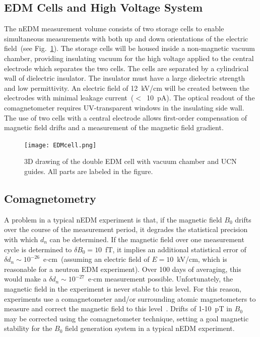 

\subsection{ EDM Cells and High Voltage System}
The nEDM measurement volume consists of two storage cells to enable
simultaneous measurements with both up and down orientations of the
electric field~(see Fig.~\ref{fig:HVcell}). The storage cells will be
housed inside a non-magnetic vacuum chamber, providing insulating
vacuum for the high voltage applied to the central electrode which
separates the two cells. The cells are separated by a cylindrical
wall of dielectric insulator. The insulator must have a large
dielectric strength and low permittivity. An electric field of
12~kV/cm will be created between the electrodes with minimal leakage
current~($<$~10~pA). The optical readout of the comagnetometer
requires UV-transparent windows in the insulating side wall. The use
of two cells with a central electrode allows first-order compensation
of magnetic field drifts and a measurement of the magnetic field
gradient.

\begin{figure}[h!]
  \centering
  \texttt{[image: EDMcell.png]}
  \caption{3D drawing of the double EDM cell with vacuum chamber and
    UCN guides. All parts are labeled in the figure.}
  \label{fig:HVcell}
\end{figure}



\subsection{Comagnetometry}
A problem in a typical nEDM experiment is that, if the magnetic field
$B_0$ drifts over the course of the measurement period, it degrades
the statistical precision with which $d_n$ can be determined.  If the
magnetic field over one measurement cycle is determined to
$\delta B_0=10$~fT, it implies an additional statistical error of
$\delta d_n\sim 10^{-26}$~e$\cdot$cm~(assuming an electric field of
$E=10$~kV/cm, which is reasonable for a neutron EDM experiment). Over
100 days of averaging, this would make a
$\delta d_n\sim 10^{-27}$~e$\cdot$cm measurement possible.
Unfortunately, the magnetic field in the experiment is never stable to
this level.  For this reason, experiments use a comagnetometer and/or
surrounding atomic magnetometers to measure and correct the magnetic
field to this
level~\cite{Baker2006,brys2005magnetic,afach2014dynamic}. Drifts of
1-10~pT in $B_0$ may be corrected using the comagnetometer technique,
setting a goal magnetic stability for the $B_0$ field generation
system in a typical nEDM experiment.



